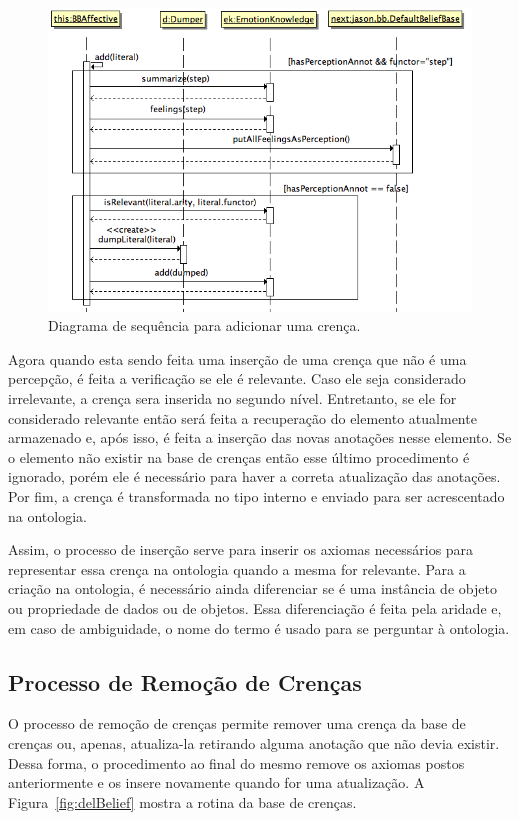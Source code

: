\begin{figure}
  \centering
  \includegraphics[width=12cm]{figuras/addB.png}
  \caption{Diagrama de sequência para adicionar uma crença.}
  \label{fig:addBelief}
\end{figure}

Agora quando esta sendo feita uma inserção de uma crença que não é uma
percepção, é feita a verificação se ele é relevante. Caso ele seja considerado
irrelevante, a crença sera inserida no segundo nível. Entretanto, se ele for
considerado relevante então será feita a recuperação do elemento atualmente
armazenado e, após isso, é feita a inserção das novas anotações nesse
elemento. Se o elemento não existir na base de crenças então esse último
procedimento é ignorado, porém ele é necessário para haver a correta
atualização das anotações. Por fim, a crença é transformada no tipo interno e
enviado para ser acrescentado na ontologia.

Assim, o processo de inserção serve para inserir os axiomas necessários para
representar essa crença na ontologia quando a mesma for relevante. Para a
criação na ontologia, é necessário ainda diferenciar se é uma instância de
objeto ou propriedade de dados ou de objetos. Essa diferenciação é feita pela
aridade e, em caso de ambiguidade, o nome do termo é usado para se perguntar à
ontologia.

\subsection{Processo de Remoção de Crenças}

O processo de remoção de crenças permite remover uma crença da base de crenças
ou, apenas, atualiza-la retirando alguma anotação que não devia existir. Dessa
forma, o procedimento ao final do mesmo remove os axiomas postos anteriormente
e os insere novamente quando for uma atualização. A Figura~\ref{fig:delBelief}
mostra a rotina da base de crenças.


